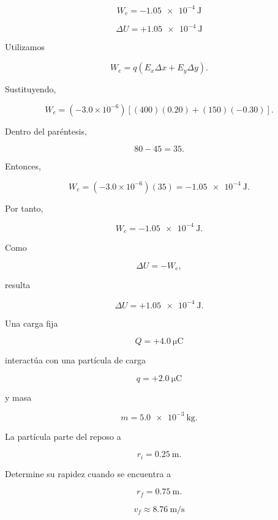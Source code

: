 \begin{respuesta}

\[
\boxed{W_e=-\SI{1.05e-4}{\joule}}
\]

\[
\boxed{\Delta U=+\SI{1.05e-4}{\joule}}
\]

\end{respuesta}

\begin{explicacion}

Utilizamos

\[
W_e=q(E_x\Delta x+E_y\Delta y).
\]

Sustituyendo,

\[
W_e
=
(-3.0\times10^{-6})
\left[
(400)(0.20)+(150)(-0.30)
\right].
\]

Dentro del paréntesis,

\[
80-45=35.
\]

Entonces,

\[
W_e
=
(-3.0\times10^{-6})(35)
=
-\SI{1.05e-4}{\joule}.
\]

Por tanto,

\[
\boxed{W_e=-\SI{1.05e-4}{\joule}}.
\]

Como

\[
\Delta U=-W_e,
\]

resulta

\[
\boxed{\Delta U=+\SI{1.05e-4}{\joule}}.
\]

\end{explicacion}


\begin{ejercicio}

Una carga fija

\[
Q=+\SI{4.0}{\micro\coulomb}
\]

interactúa con una partícula de carga

\[
q=+\SI{2.0}{\micro\coulomb}
\]

y masa

\[
m=\SI{5.0e-3}{\kilogram}.
\]

La partícula parte del reposo a

\[
r_i=\SI{0.25}{\metre}.
\]

Determine su rapidez cuando se encuentra a

\[
r_f=\SI{0.75}{\metre}.
\]

\end{ejercicio}

\begin{respuesta}

\[
\boxed{v_f\approx\SI{8.76}{\metre\per\second}}
\]

\end{respuesta}


